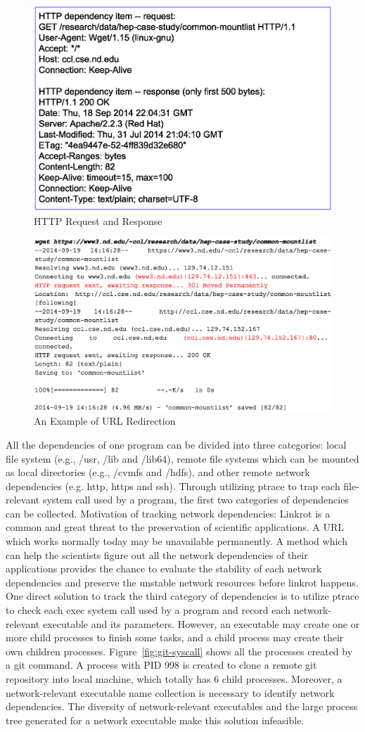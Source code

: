 \documentclass[procedia]{easychair}
\begin{document}
\begin{figure}
\centering
\includegraphics[width=.6\textwidth]{http_packet.eps}
\caption{HTTP Request and Response}
\label{fig:http_packet}
\end{figure}

\begin{figure}
\centering
\includegraphics[width=.6\textwidth]{url_redirection.eps}
\caption{An Example of URL Redirection}
\label{fig:url_redirection}
\end{figure}

All the dependencies of one program can be divided into three categories: local file system (e.g., /usr, /lib and /lib64), remote file systems which can be mounted as local directories (e.g., /cvmfs and /hdfs), and other remote network dependencies (e.g. http, https and ssh).
Through utilizing ptrace to trap each file-relevant system call used by a program, the first two categories of dependencies can be collected. 
Motivation of tracking network dependencies: Linkrot is a common and great threat to the preservation of scientific applications. A URL which works normally today may be unavailable permanently. A method which can help the scientists figure out all the network dependencies of their applications provides the chance to evaluate the stability of each network dependencies and preserve the unstable network resources before linkrot happens.
One direct solution to track the third category of dependencies is to utilize ptrace to check each exec system call used by a program and record each network-relevant executable and its parameters. However, an executable may create one or more child processes to finish some tasks, and a child process may create their own children processes. Figure~\ref{fig:git-syscall} shows all the processes created by a git command. A process with PID 998 is created to clone a remote git repository into local machine, which totally has 6 child processes. Moreover, a network-relevant executable name collection is necessary to identify network dependencies. The diversity of network-relevant executables and the large process tree generated for a network executable make this solution infeasible.
\end{document}
